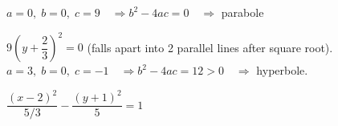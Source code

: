 \begin{Answer}\phantom{}

    	\Question $a=0, \; b=0, \; c = 9 \quad \Rightarrow b^2-4ac= 0 \quad \Rightarrow$ parabole
    	
    	 $ 9\left(y + \dfrac{2}{3} \right)^2  = 0$ \quad (falls apart into 2 parallel lines after square root).
    	\Question $a=3, \; b=0, \; c = -1 \quad \Rightarrow b^2-4ac=12 > 0 \quad \Rightarrow$ hyperbole.
    	
    	 $\dfrac{\left(x - 2 \right)^2}{5/3} - \dfrac{\left(y+1 \right)^2}{5} = 1 $
    	
    	
    	
    	
    	
        
\end{Answer}


\fi %
